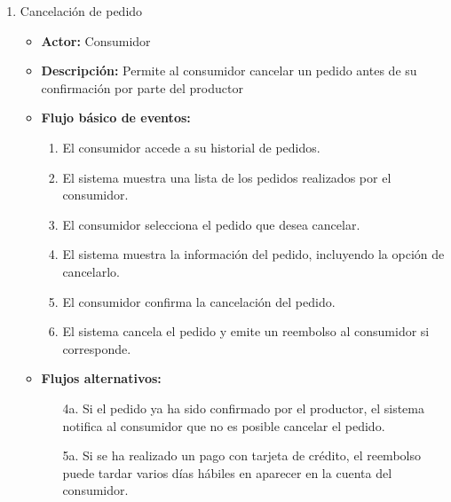 \begin{enumerate}[CU-1:]
\item{Cancelación de pedido}
\begin{itemize}
\item \textbf{Actor:} Consumidor
\item \textbf{Descripción:} Permite al consumidor cancelar un pedido antes de su confirmación por parte del productor
\item \textbf{Flujo básico de eventos:}
	\begin{enumerate}[1:]
\item El consumidor accede a su historial de pedidos.
\item El sistema muestra una lista de los pedidos realizados por el consumidor.
\item El consumidor selecciona el pedido que desea cancelar.
\item El sistema muestra la información del pedido, incluyendo la opción de cancelarlo.
\item El consumidor confirma la cancelación del pedido.
\item El sistema cancela el pedido y emite un reembolso al consumidor si corresponde.
\end{enumerate}
\item \textbf{Flujos alternativos:}
\begin{enumerate}
\item [4a.] Si el pedido ya ha sido confirmado por el productor, el sistema notifica al consumidor que no es posible cancelar el pedido.
\item [5a.] Si se ha realizado un pago con tarjeta de crédito, el reembolso puede tardar varios días hábiles en aparecer en la cuenta del consumidor.
\end{enumerate}
\end{itemize}


\end{enumerate}
